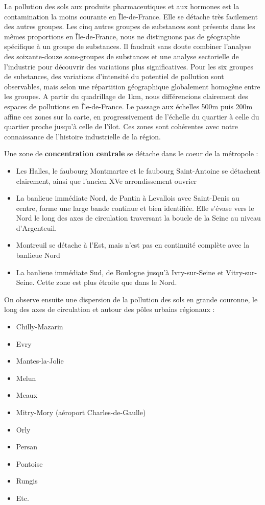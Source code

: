 \documentclass[a4paper,twoside,12pt]{book}
\begin{document}
La pollution des sols aux produits pharmaceutiques et aux hormones est la contamination la moins courante en Île-de-France. Elle se détache très facilement des autres groupes. Les cinq autres groupes de substances sont présents dans les mêmes proportions en Île-de-France, nous ne distinguons pas de géographie spécifique à un groupe de substances. Il faudrait sans doute combiner l'analyse des soixante-douze sous-groupes de substances et une analyse sectorielle de l'industrie pour découvrir des variations plus significatives. Pour les six groupes de substances, des variations d'intensité du potentiel de pollution sont observables, mais selon une répartition géographique globalement homogène entre les groupes. A partir du quadrillage de 1km, nous différencions clairement des espaces de pollutions en Île-de-France. Le passage aux échelles 500m puis 200m affine ces zones sur la carte, en progressivement de l'échelle du quartier à celle du quartier proche jusqu'à celle de l'îlot. Ces zones sont cohérentes avec notre connaissance de l'histoire industrielle de la région.  

Une zone de \textbf{concentration centrale} se détache dans le coeur de la métropole : 
\begin{itemize}
\item Les Halles, le faubourg Montmartre et le faubourg Saint-Antoine se détachent clairement, ainsi que l'ancien XVe arrondissement ouvrier
\item La banlieue immédiate Nord, de Pantin à Levallois avec Saint-Denis au centre, forme une large bande continue et bien identifiée. Elle s'évase vers le Nord le long des axes de circulation traversant la boucle de la Seine au niveau d'Argenteuil. 
\item Montreuil se détache à l'Est, mais n'est pas en continuité complète avec la banlieue Nord
\item La banlieue immédiate Sud, de Boulogne jusqu'à Ivry-sur-Seine et Vitry-sur-Seine. Cette zone est plus étroite que dans le Nord.  
\end{itemize}

On observe ensuite une dispersion de la pollution des sols en grande couronne, le long des axes de circulation et autour des pôles urbains régionaux : 
\begin{itemize} 
\item Chilly-Mazarin
\item Evry
\item Mantes-la-Jolie
\item Melun 
\item Meaux 
\item Mitry-Mory (aéroport Charles-de-Gaulle)
\item Orly
\item Persan
\item Pontoise 
\item Rungis
\item Etc.  
\end{itemize}
\end{document}

